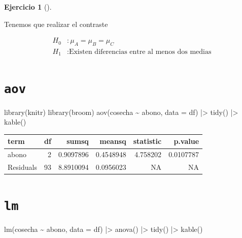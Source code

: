 \documentclass[
  a4paper,
]{scrreport}
\newenvironment{Shaded}{\begin{snugshade}}{\end{snugshade}}
\newcommand{\AttributeTok}[1]{\textcolor[rgb]{0.40,0.45,0.13}{#1}}
\newcommand{\FunctionTok}[1]{\textcolor[rgb]{0.28,0.35,0.67}{#1}}
\newcommand{\NormalTok}[1]{\textcolor[rgb]{0.00,0.23,0.31}{#1}}
\newcommand{\SpecialCharTok}[1]{\textcolor[rgb]{0.37,0.37,0.37}{#1}}
\theoremstyle{definition}
\newtheorem{exercise}{Ejercicio}[chapter]
\theoremstyle{remark}
\begin{document}
\begin{exercise}[]
\begin{enumerate}
  \begin{tcolorbox}[enhanced jigsaw, breakable, toptitle=1mm, colbacktitle=quarto-callout-tip-color!10!white, rightrule=.15mm, opacityback=0, opacitybacktitle=0.6, titlerule=0mm, coltitle=black, colframe=quarto-callout-tip-color-frame, colback=white, bottomtitle=1mm, leftrule=.75mm, toprule=.15mm, title=\textcolor{quarto-callout-tip-color}{\faLightbulb}\hspace{0.5em}{Solución}, arc=.35mm, bottomrule=.15mm, left=2mm]

  Tenemos que realizar el contraste

  \begin{align*}
  H_0 &: \mu_A = \mu_B = \mu_C \\
  H_1 &: \mbox{Existen diferencias entre al menos dos medias}
  \end{align*}

  \section{\texorpdfstring{\texttt{aov}}{aov}}

\begin{Shaded}
\begin{Highlighting}[]
\FunctionTok{library}\NormalTok{(knitr)}
\FunctionTok{library}\NormalTok{(broom)}
\FunctionTok{aov}\NormalTok{(cosecha }\SpecialCharTok{\textasciitilde{}}\NormalTok{ abono, }\AttributeTok{data =}\NormalTok{ df) }\SpecialCharTok{|\textgreater{}} 
    \FunctionTok{tidy}\NormalTok{() }\SpecialCharTok{|\textgreater{}} 
    \FunctionTok{kable}\NormalTok{()}
\end{Highlighting}
\end{Shaded}

  \begin{longtable}[]{@{}lrrrrr@{}}
  \toprule\noalign{}
  term & df & sumsq & meansq & statistic & p.value \\
  \midrule\noalign{}
  \endhead
  \bottomrule\noalign{}
  \endlastfoot
  abono & 2 & 0.9097896 & 0.4548948 & 4.758202 & 0.0107787 \\
  Residuals & 93 & 8.8910094 & 0.0956023 & NA & NA \\
  \end{longtable}

  \section{\texorpdfstring{\texttt{lm}}{lm}}

\begin{Shaded}
\begin{Highlighting}[]
\FunctionTok{lm}\NormalTok{(cosecha }\SpecialCharTok{\textasciitilde{}}\NormalTok{ abono, }\AttributeTok{data =}\NormalTok{ df) }\SpecialCharTok{|\textgreater{}} 
    \FunctionTok{anova}\NormalTok{() }\SpecialCharTok{|\textgreater{}} 
    \FunctionTok{tidy}\NormalTok{() }\SpecialCharTok{|\textgreater{}} 
    \FunctionTok{kable}\NormalTok{()}
\end{Highlighting}
\end{Shaded}


\end{tcolorbox}
\end{enumerate}
\end{exercise}
\end{document}
